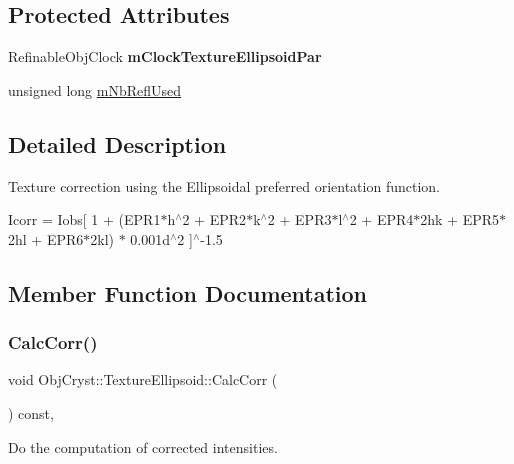 \subsection*{Protected Attributes}
\begin{DoxyCompactItemize}
\item 
\mbox{\label{class_obj_cryst_1_1_texture_ellipsoid_ad727af6023aaf16f199e32c18801ffce}} 
Refinable\+Obj\+Clock {\bfseries m\+Clock\+Texture\+Ellipsoid\+Par}
\item 
unsigned long \mbox{\hyperlink{class_obj_cryst_1_1_texture_ellipsoid_ac0ef459d02d354bf13b624ae7373755f}{m\+Nb\+Refl\+Used}}
\end{DoxyCompactItemize}


\subsection{Detailed Description}
Texture correction using the Ellipsoidal preferred orientation function.

Icorr = Iobs\mbox{[} 1 + (E\+P\+R1$\ast$h$^\wedge$2 + E\+P\+R2$\ast$k$^\wedge$2 + E\+P\+R3$\ast$l$^\wedge$2 + E\+P\+R4$\ast$2hk + E\+P\+R5$\ast$2hl + E\+P\+R6$\ast$2kl) $\ast$ 0.\+001d$^\wedge$2 \mbox{]}$^\wedge$-\/1.5 

\subsection{Member Function Documentation}
\mbox{\label{class_obj_cryst_1_1_texture_ellipsoid_a5b7f34bd6511edb7f0eaab7c6a5e58b8}} 
\subsubsection{\texorpdfstring{CalcCorr()}{CalcCorr()}}
{\footnotesize\ttfamily void Obj\+Cryst\+::\+Texture\+Ellipsoid\+::\+Calc\+Corr (\begin{DoxyParamCaption}{ }\end{DoxyParamCaption}) const\hspace{0.3cm}{\ttfamily [protected]}, {\ttfamily [virtual]}}



Do the computation of corrected intensities. 

